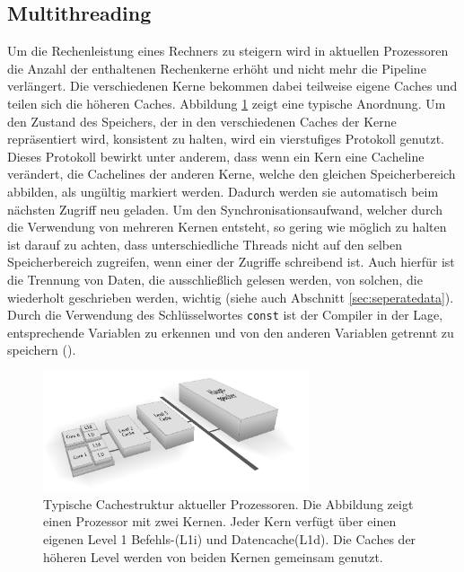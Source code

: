 \subsection{Multithreading}

Um die Rechenleistung eines Rechners zu steigern wird in aktuellen Prozessoren die Anzahl der enthaltenen Rechenkerne erhöht und nicht mehr die Pipeline verlängert. Die verschiedenen Kerne bekommen dabei teilweise eigene Caches und teilen sich die höheren Caches. Abbildung \ref{fig:cpumem} zeigt eine typische Anordnung. Um den Zustand des Speichers, der in den verschiedenen Caches der Kerne repräsentiert wird, konsistent zu halten, wird ein vierstufiges Protokoll genutzt. Dieses Protokoll bewirkt unter anderem, dass wenn ein Kern eine Cacheline verändert, die Cachelines der anderen Kerne, welche den gleichen Speicherbereich abbilden, als ungültig markiert werden. Dadurch werden sie automatisch beim nächsten Zugriff neu geladen.
Um den Synchronisationsaufwand, welcher durch die Verwendung von mehreren Kernen entsteht, so gering wie möglich zu halten ist darauf zu achten, dass unterschiedliche Threads nicht auf den selben Speicherbereich zugreifen, wenn einer der Zugriffe schreibend ist. Auch hierfür ist die Trennung von Daten, die ausschließlich gelesen werden, von solchen, die wiederholt geschrieben werden, wichtig (siehe auch Abschnitt \ref{sec:seperatedata}).
Durch die Verwendung des Schlüsselwortes \verb|const| ist der Compiler in der Lage, entsprechende Variablen zu erkennen und von den anderen Variablen getrennt zu speichern (\cite{Drepper07}).

\begin{figure}\centering
\includegraphics[width=0.7\textwidth]{images/cpumem.pdf} 
\caption[Typische Cachestruktur aktueller Prozessoren.]{Typische Cachestruktur aktueller Prozessoren. Die Abbildung zeigt einen Prozessor mit zwei Kernen. Jeder Kern verfügt über einen eigenen Level 1 Befehls-(L1i) und Datencache(L1d). Die Caches der höheren Level werden von beiden Kernen gemeinsam genutzt.}
\label{fig:cpumem}
\end{figure}

